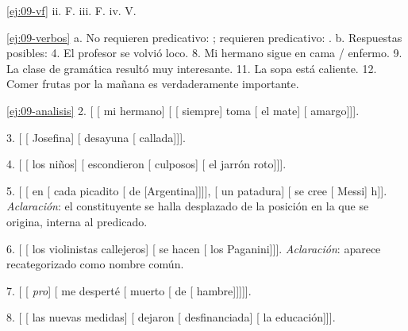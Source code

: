 \begin{solucion}{\ref{ej:09-vf}}
ii. F. iii. F. iv. V.
\end{solucion}

\begin{solucion}{\ref{ej:09-verbos}}
a. No requieren predicativo: ; requieren predicativo: . b. Respuestas posibles: 4. El profesor se volvió loco. 8. Mi
hermano sigue en cama / enfermo. 9. La clase de gramática resultó muy
interesante. 11. La sopa está caliente. 12. Comer frutas por la mañana es
verdaderamente importante.
\end{solucion}

\begin{solucion}{\ref{ej:09-analisis}}
2. [ [ mi hermano] [
[ siempre] toma [ el
mate] [ amargo]]].

3. [ [ Josefina] [ desayuna
[ callada]]].

4. [ [ los niños] [
escondieron [ culposos] [
el jarrón roto]]].

5. [ [ en [ cada
picadito [ de [Argentina]]]],
[ un patadura] [ se
cree [ Messi] h]]. \textit{Aclaración}: el
constituyente  se halla desplazado de la
posición en la que se origina, interna al predicado.

6. [ [ los violinistas
callejeros] [ se hacen [
los Paganini]]]. \textit{Aclaración}: 
aparece recategorizado como nombre común.

7. [ [ \textit{pro}] [ me
desperté [ muerto [ de
[ hambre]]]]].

8. [ [ las nuevas medidas]
[ dejaron [ desfinanciada]
[ la educación]]].
\end{solucion}

